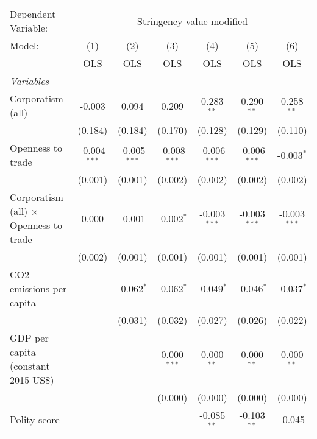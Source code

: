 
\begingroup
\centering
\begin{tabular}{lcccccc}
   \toprule
   Dependent Variable: & \multicolumn{6}{c}{Stringency value modified}\\
   Model:                                        & (1)            & (2)            & (3)            & (4)            & (5)            & (6)\\  
                                                 &  OLS           & OLS            & OLS            & OLS            & OLS            & OLS\\  
   \midrule
   \emph{Variables}\\
   Corporatism (all)                             & -0.003         & 0.094          & 0.209          & 0.283$^{**}$   & 0.290$^{**}$   & 0.258$^{**}$\\   
                                                 & (0.184)        & (0.184)        & (0.170)        & (0.128)        & (0.129)        & (0.110)\\   
   Openness to trade                             & -0.004$^{***}$ & -0.005$^{***}$ & -0.008$^{***}$ & -0.006$^{***}$ & -0.006$^{***}$ & -0.003$^{*}$\\   
                                                 & (0.001)        & (0.001)        & (0.002)        & (0.002)        & (0.002)        & (0.002)\\   
   Corporatism (all) $\times$ Openness to trade  & 0.000          & -0.001         & -0.002$^{*}$   & -0.003$^{***}$ & -0.003$^{***}$ & -0.003$^{***}$\\   
                                                 & (0.002)        & (0.001)        & (0.001)        & (0.001)        & (0.001)        & (0.001)\\   
   CO2 emissions per capita                      &                & -0.062$^{*}$   & -0.062$^{*}$   & -0.049$^{*}$   & -0.046$^{*}$   & -0.037$^{*}$\\   
                                                 &                & (0.031)        & (0.032)        & (0.027)        & (0.026)        & (0.022)\\   
   GDP per capita (constant 2015 US\$)           &                &                & 0.000$^{***}$  & 0.000$^{**}$   & 0.000$^{**}$   & 0.000$^{**}$\\   
                                                 &                &                & (0.000)        & (0.000)        & (0.000)        & (0.000)\\   
   Polity score                                  &                &                &                & -0.085$^{**}$  & -0.103$^{**}$  & -0.045\\   

\end{tabular}
